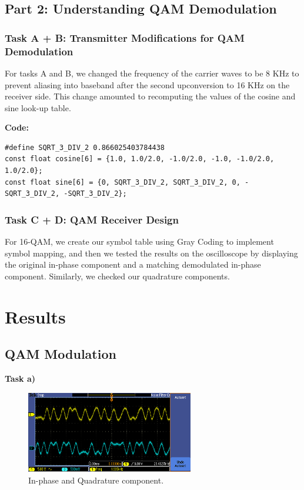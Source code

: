 \documentclass{article}
\begin{document}
\subsection{Part 2: Understanding QAM Demodulation}

\subsubsection{Task A + B: Transmitter Modifications for QAM Demodulation}
For tasks A and B, we changed the frequency of the carrier waves to be 8 KHz to prevent aliasing into baseband after the second upconversion to 16 KHz on the receiver side. This change amounted to recomputing the values of the cosine and sine look-up table.

\textbf{Code:}
\begin{verbatim}
#define SQRT_3_DIV_2 0.866025403784438
const float cosine[6] = {1.0, 1.0/2.0, -1.0/2.0, -1.0, -1.0/2.0, 1.0/2.0};
const float sine[6] = {0, SQRT_3_DIV_2, SQRT_3_DIV_2, 0, -SQRT_3_DIV_2, -SQRT_3_DIV_2};
\end{verbatim}

\subsubsection{Task C + D: QAM Receiver Design}
For 16-QAM, we create our symbol table using Gray Coding to implement symbol mapping, and then we tested the results on the oscilloscope by displaying the original in-phase component and a matching demodulated in-phase component. Similarly, we checked our quadrature components.


\pagebreak
\section{Results}

\subsection{QAM Modulation}

\textbf{Task a)}
\begin{figure}[h]
  \begin{center}
    \includegraphics[width=0.65\textwidth]{img/task_a_oscilloscope.png}
    \caption{In-phase and Quadrature component.}
  \end{center}
\end{figure}
\end{document}
